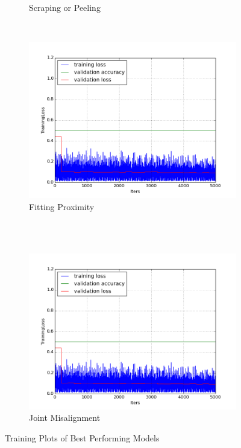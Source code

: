\documentclass[a4paper,11pt]{article}
\begin{document}
\begin{figure}
\begin{subfigure}[b]{0.3\textwidth}
                \caption{Scraping or Peeling}
                \label{fig:tiger}
        \end{subfigure}
        ~ %
        \begin{subfigure}[b]{0.3\textwidth}
                \includegraphics[width=\textwidth]{images/plot_water_contam(fa).png}
                \caption{Fitting Proximity}
                \label{fig:mouse}
        \end{subfigure}
        \\
        ~ %
        \begin{subfigure}[b]{0.3\textwidth}
                \includegraphics[width=\textwidth]{images/plot_water_contam(fa).png}
                \caption{Joint Misalignment}
                \label{fig:gull}
        \end{subfigure}%
        \caption{Training Plots of Best Performing Models}\label{fig:animals}
    \label{f69}
\end{figure}
\end{document}
